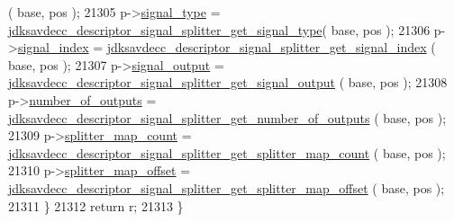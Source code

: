 \begin{DoxyCode}
      ( base, pos );
21305         p->\hyperlink{structjdksavdecc__descriptor__signal__splitter_a248e60ef99d5ed1779989d1dd6b6dc5a}{signal\_type} = 
      \hyperlink{group__descriptor__signal__splitter_gadcbd975d006ce2a1c3630fe0df6273a4}{jdksavdecc\_descriptor\_signal\_splitter\_get\_signal\_type}(
       base, pos );
21306         p->\hyperlink{structjdksavdecc__descriptor__signal__splitter_ae2e81a95ee9ad83f1fe22b6a1ee29075}{signal\_index} = 
      \hyperlink{group__descriptor__signal__splitter_gac0b8125fd6afd7643f8ae700e7df5424}{jdksavdecc\_descriptor\_signal\_splitter\_get\_signal\_index}
      ( base, pos );
21307         p->\hyperlink{structjdksavdecc__descriptor__signal__splitter_ab4b91864e6fc335d7e86536d9f4461e4}{signal\_output} = 
      \hyperlink{group__descriptor__signal__splitter_ga5d6cfd8e9ff9f49e6eb81be593ef0bf9}{jdksavdecc\_descriptor\_signal\_splitter\_get\_signal\_output}
      ( base, pos );
21308         p->\hyperlink{structjdksavdecc__descriptor__signal__splitter_acce19609ff3454a0c9b0213591331fa7}{number\_of\_outputs} = 
      \hyperlink{group__descriptor__signal__splitter_gab51a6ee84d2ffc4921e1d400b0ff6283}{jdksavdecc\_descriptor\_signal\_splitter\_get\_number\_of\_outputs}
      ( base, pos );
21309         p->\hyperlink{structjdksavdecc__descriptor__signal__splitter_aebf6a6b0659a75f9a4eea6629f987cac}{splitter\_map\_count} = 
      \hyperlink{group__descriptor__signal__splitter_gab3bf33fbc001d13105e82eabbdf0b6a6}{jdksavdecc\_descriptor\_signal\_splitter\_get\_splitter\_map\_count}
      ( base, pos );
21310         p->\hyperlink{structjdksavdecc__descriptor__signal__splitter_aed40a18f33bb308d5d9c862701af62fe}{splitter\_map\_offset} = 
      \hyperlink{group__descriptor__signal__splitter_gafa7541f8c5237eaba9c6f35bbedf61d6}{jdksavdecc\_descriptor\_signal\_splitter\_get\_splitter\_map\_offset}
      ( base, pos );
21311     \}
21312     \textcolor{keywordflow}{return} r;
21313 \}
\end{DoxyCode}


